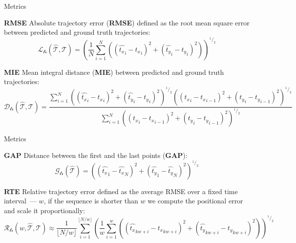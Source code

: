 \documentclass[9pt,pdf,hyperref={unicode}]{beamer}
\newcommand{\calT}{\mathcal{T}}
\begin{document}
\begin{frame}{Metrics}
\begin{block}{\textbf{RMSE}}
Absolute trajectory error (\textbf{RMSE}) defined as the root mean square error between predicted and ground truth trajectories:
\begin{equation}
    \mathcal{L_{\text{tr}}}(\hat{\calT}, \calT) = (\frac{1}{N}\sum_{i=1}^N ((\hat{t_x}_i - {t_x}_i)^2 + (\hat{t_y}_i - {t_y}_i)^2))^{^1/_2}
\end{equation}
\end{block}
\begin{block}{\textbf{MIE}}
Mean integral distance (\textbf{MIE}) between predicted and ground truth trajectories:
\begin{equation}
    \mathcal{D_{\text{tr}}}(\hat{\calT}, \calT) = \frac{
    \sum_{i=1}^N ((\hat{t_x}_i - {t_x}_i)^2 + (\hat{t_y}_i - {t_y}_i)^2)^{^1/_2}  (({t_x}_i - {t_x}_{i-1})^2 + ({t_y}_i - {t_y}_{i-1})^2)^{^1/_2}}{\sum_{i=1}^N (({t_x}_i - {t_x}_{i-1})^2 +({t_y}_i - {t_y}_{i-1})^2)^{^1/_2}}
\end{equation}
\end{block}
\end{frame}
\begin{frame}{Metrics}
\begin{block}{\textbf{GAP}}
Distance between the first and the last points (\textbf{GAP}):
\begin{equation}
    \label{eq:metric_gap}
    \mathcal{G_{\text{tr}}}\left(\hat{\calT}\right) =  \left(\left(\hat{t_x}_1 - \hat{t_x}_{N}\right)^2 + \left(\hat{t_y}_1 - \hat{t_y}_{N}\right)^2\right)^{^1/_2}
\end{equation}{}
\end{block}
\begin{block}{\textbf{RTE}}
Relative trajectory error defined as the average RMSE over a fixed time interval~--- $w$, if the sequence is shorter than $w$ we compute the positional error and scale it proportionally:
\begin{equation}
    \label{eq:metric_rte}
    \mathcal{R_{\text{tr}}}(w, \hat{\calT}, \calT) \approx \frac{1}{\lfloor N/w\rfloor}\sum_{i=1}^{\lfloor N/w\rfloor}(\frac{1}{w}\sum_{i=1}^w ((\hat{t_x}_{kw + i} - {t_x}_{kw + i})^2 + (\hat{t_y}_{kw + i} - {t_y}_{kw + i})^2))^{^1/_2}
\end{equation}{}
\end{block}
\end{frame}
\end{document}
